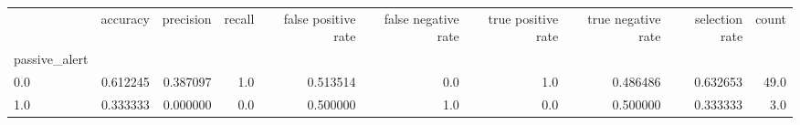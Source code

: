 \begin{tabular}{lrrrrrrrrr}
\toprule
{} &  accuracy &  precision &  recall &  false positive rate &  false negative rate &  true positive rate &  true negative rate &  selection rate &  count \\
passive\_alert &           &            &         &                      &                      &                     &                     &                 &        \\
\midrule
0.0           &  0.612245 &   0.387097 &     1.0 &             0.513514 &                  0.0 &                 1.0 &            0.486486 &        0.632653 &   49.0 \\
1.0           &  0.333333 &   0.000000 &     0.0 &             0.500000 &                  1.0 &                 0.0 &            0.500000 &        0.333333 &    3.0 \\
\bottomrule
\end{tabular}
